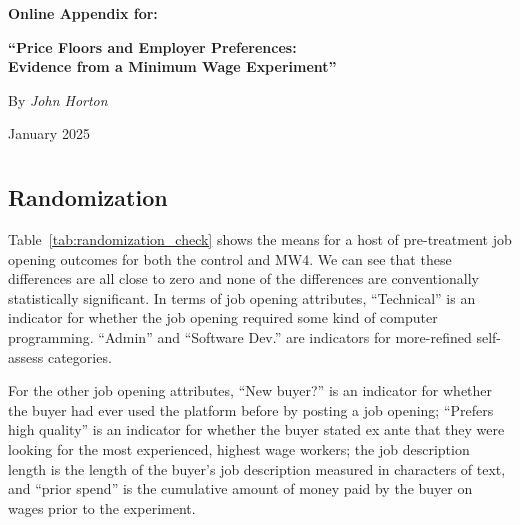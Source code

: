 \documentclass[AER]{AEA}
\begin{document}
\clearpage




\clearpage 

\newpage

\appendix

\renewcommand{\thepage}{A\arabic{page}}  %
\setcounter{page}{1}  %

\renewcommand{\leftmark}{ONLINE APPENDIX: PRICE FLOORS AND EMPLOYER PREFERENCES}

\begin{center}
\huge\textbf{Online Appendix for:}
\vspace{0.25cm}

\huge\textbf{``Price Floors and Employer Preferences:\\
Evidence from a Minimum Wage Experiment''}

\vspace{0.5cm}
\normalsize By \textit{John Horton}

\vspace{0.5cm}
January 2025
\vspace{-0.5cm}
\end{center}



\section{} \label{sec:iv} 

\subsection{Randomization} \label{sec:randomization} 

Table~\ref{tab:randomization_check} shows the means for a host of pre-treatment job opening outcomes for both the control and MW4.
We can see that these differences are all close to zero and none of the differences are conventionally statistically significant. 
In terms of job opening attributes, ``Technical'' is an indicator for whether the job opening required some kind of computer programming.
``Admin'' and ``Software Dev.'' are indicators for more-refined self-assess categories.

For the other job opening attributes, ``New buyer?'' is an indicator for whether the buyer had ever used the platform before by posting a job opening; ``Prefers high quality'' is an indicator for whether the buyer stated ex ante that they were looking for the most experienced, highest wage workers; the job description length is the length of the buyer's job description measured in characters of text, and ``prior spend'' is the cumulative amount of money paid by the buyer on wages prior to the experiment.   
\end{document}
